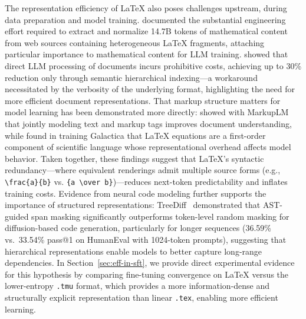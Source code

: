 The representation efficiency of \LaTeX{} also poses challenges upstream, during data preparation and model training. \citet{paster2023openwebmath} documented the substantial engineering effort required to extract and normalize 14.7B tokens of mathematical content from web sources containing heterogeneous \LaTeX{} fragments, attaching particular importance to mathematical content for LLM training. \citet{lin2024accurate} showed that direct LLM processing of documents incurs prohibitive costs, achieving up to 30\% reduction only through semantic hierarchical indexing---a workaround necessitated by the verbosity of the underlying format, highlighting the need for more efficient document representations. That markup structure matters for model learning has been demonstrated more directly: \citet{li2022markuplm} showed with MarkupLM that jointly modeling text and markup tags improves document understanding, while \citet{taylor2022galactica} found in training Galactica that \LaTeX{} equations are a first-order component of scientific language whose representational overhead affects model behavior. Taken together, these findings suggest that \LaTeX{}'s syntactic redundancy---where equivalent renderings admit multiple source forms (e.g., \verb|\frac{a}{b}| vs. \verb|{a \over b}|)---reduces next-token predictability and inflates training costs. Evidence from neural code modeling further supports the importance of structured representations: TreeDiff~\cite{zeng2026treediffastguidedcodegeneration} demonstrated that AST-guided span masking significantly outperforms token-level random masking for diffusion-based code generation, particularly for longer sequences (36.59\% vs.\ 33.54\% pass@1 on HumanEval with 1024-token prompts), suggesting that hierarchical representations enable models to better capture long-range dependencies. In Section~\ref{sec:eff-in-sft}, we provide direct experimental evidence for this hypothesis by comparing fine-tuning convergence on \LaTeX{} versus the lower-entropy \texttt{.tmu} format, which provides a more information-dense and structurally explicit representation than linear \texttt{.tex}, enabling more efficient learning.

